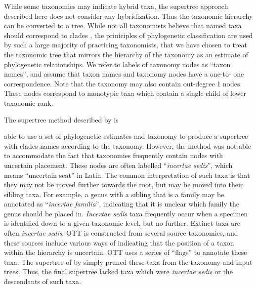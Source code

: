 \documentclass[english]{article}
\begin{document}
While some taxonomies may indicate hybrid taxa, the supertree approach
described here does not consider any hybridization.
Thus the taxonomic
hierarchy can be converted to a tree.
While not all taxonomists
believe that named taxa should correspond to clades \citep[see, for
example,][]{HorandlS2010}, the priniciples of phylogenetic
classification are used by such a large majority of practicing
taxonomists, that we have chosen to treat the taxonomic tree that
mirrors the hierarchy of the taxonomy as an estimate of phylogenetic
relationships.
We refer to labels of taxonomy nodes as ``taxon
names'', and assume that taxon names and taxonomy nodes have a one-to-
one correspondence.
Note that the taxonomy may also contain out-degree
1 nodes.
These nodes correspond to monotypic taxa which contain a
single child of lower taxonomic rank.

The supertree method described by \citet{redelings2017supertree} is

able to use a set of phylogenetic estimates and taxonomy to produce a
supertree with clades names according to the taxonomy.
However, the
method was not able to accommodate the fact that taxonomies frequently
contain nodes with uncertain placement.
These nodes are often labelled
``\emph{incertae sedis}'', which means ``uncertain seat'' in Latin.
The common interpretation of such taxa is that they may not be moved
further towards the root, but may be moved into their sibling taxa.
For example, a genus with a sibling that is a family may be annotated
as ``\emph{incertae familia}'', indicating that it is unclear which
family the genus should be placed in.
\emph{Incertae sedis} taxa
frequently occur when a specimen is identified down to a given
taxonomic level, but no further.
Extinct taxa are often \emph{incertae
sedis}.
OTT is constructed from several source taxonomies, and these
sources include various ways of indicating that the position of a
taxon within the hierarchy is uncertain.
OTT uses a series of
``flags'' to annotate these taxa.
The supertree of by
\citet{redelings2017supertree} simply pruned these taxa from the
taxonomy and input trees.
Thus, the final supertree lacked taxa which
were \emph{incertae sedis} or the descendants of such taxa.
\end{document}

